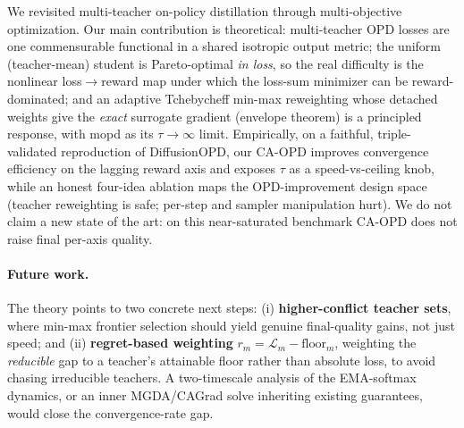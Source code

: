 We revisited multi-teacher on-policy distillation through multi-objective
optimization. Our main contribution is theoretical: multi-teacher OPD losses are
one commensurable functional in a shared isotropic output metric; the uniform
(teacher-mean) student is Pareto-optimal \emph{in loss}, so the real difficulty
is the nonlinear loss$\to$reward map under which the loss-sum minimizer can be
reward-dominated; and an adaptive Tchebycheff min-max reweighting whose detached
weights give the \emph{exact} surrogate gradient (envelope theorem) is a
principled response, with mopd as its $\tau\to\infty$ limit. Empirically, on a
faithful, triple-validated reproduction of DiffusionOPD, our CA-OPD improves
convergence efficiency on the lagging reward axis and exposes $\tau$ as a
speed-vs-ceiling knob, while an honest four-idea ablation maps the OPD-improvement
design space (teacher reweighting is safe; per-step and sampler manipulation
hurt). We do not claim a new state of the art: on this near-saturated benchmark
CA-OPD does not raise final per-axis quality.

\paragraph{Future work.}
The theory points to two concrete next steps: (i) \textbf{higher-conflict teacher
sets}, where min-max frontier selection should yield genuine final-quality gains,
not just speed; and (ii) \textbf{regret-based weighting}
$r_m=\mathcal L_m-\mathrm{floor}_m$, weighting the \emph{reducible} gap to a
teacher's attainable floor rather than absolute loss, to avoid chasing
irreducible teachers. A two-timescale analysis of the EMA-softmax dynamics, or an
inner MGDA/CAGrad solve inheriting existing guarantees, would close the
convergence-rate gap.
